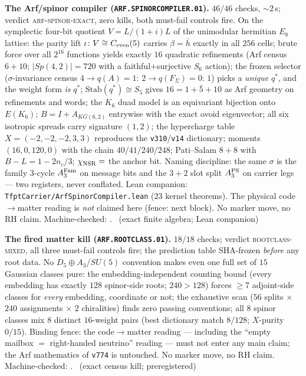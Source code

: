 \par\smallskip\noindent\textbf{The Arf/spinor compiler
(\texttt{ARF.SPINORCOMPILER.01}).}
$46/46$ checks, ${\sim}2$\,s; verdict \textsc{arf-spinor-exact},
zero kills, both must-fail controls fire.  On the symplectic
four-bit quotient $V=L/(1{+}i)L$ of the unimodular hermitian $E_8$
lattice: the parity lift $\iota\colon V\cong C_{\rm even}(5)$
carries $\beta=\bar h$ exactly in all $256$ cells; brute force
over all $2^{16}$ functions yields exactly $16$ quadratic
refinements (Arf census $6+10$; $|Sp(4,2)|=720$ with a
faithful$+$surjective $S_6$ action); the frozen selector
($\sigma$-invariance census $4\to q(A){=}1$: $2\to
q(F_\Sigma){=}0$: $1$) picks a \emph{unique} $q^{*}$, and the
weight form \emph{is} $q^{*}$; $\mathrm{Stab}(q^{*})\cong S_5$
gives $16=1+\bar 5+10$ as Arf geometry on refinements and words;
the $K_6$ duad model is an equivariant bijection onto $E(K_6)$;
$B=I+A_{KG(6,2)}$ entrywise with the exact ovoid eigenvector; all
six isotropic spreads carry signature $(1,2)$; the hypercharge
table $X=(-2,-2,-2,3,3)$ reproduces the \texttt{v310}/\texttt{v14}
dictionary; moments $(16,0,120,0)$ with the chain $40/41/240/248$;
Pati--Salam $8+8$ with $B{-}L=1-2n_c/3$; $\chi_{\rm NSR}=$ the
anchor bit.  Naming discipline: the same $\sigma$ is the family
3-cycle $A_3^{\rm Fam}$ on message bits and the $3{+}2$ slot split
$A_3^{\rm PS}$ on carrier legs --- two registers, never conflated.
Lean companion: \texttt{TfptCarrier/ArfSpinorCompiler.lean} ($23$
kernel theorems).  The physical code$\to$matter reading is
\emph{not} claimed here (fence: next block).  No marker move, no
RH claim.
Machine-checked: .
\mE\ (exact finite algebra; Lean companion)
\par\smallskip

\par\smallskip\noindent\textbf{The fired matter kill
(\texttt{ARF.ROOTCLASS.01}).}
$18/18$ checks; verdict \textsc{rootclass-mixed}, all three
must-fail controls fire; the prediction table SHA-frozen
\emph{before} any root data.  No $D_5{\oplus}A_3$/$SU(5)$
convention makes even one full set of $15$ Gaussian classes pure:
the embedding-independent counting bound (every embedding has
exactly $128$ spinor-side roots; $240>128$) forces $\ge7$
adjoint-side classes for \emph{every} embedding, coordinate or
not; the exhaustive scan ($56$ splits $\times$ $240$ assignments
$\times$ $2$ chiralities) finds zero passing conventions; all $8$
spinor classes mix $8$ distinct $16$-weight pairs (best dictionary
match $8/128$; $X$-purity $0/15$).  Binding fence: the
code$\to$matter reading --- including the ``empty mailbox $=$
right-handed neutrino'' reading --- must not enter any main claim;
the Arf mathematics of \texttt{v774} is untouched.  No marker
move, no RH claim.
Machine-checked: .
\mE\ (exact census kill; preregistered)
\par\smallskip

